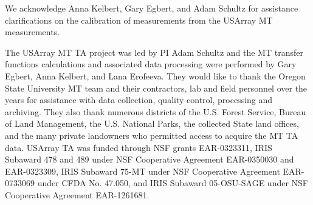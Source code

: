 \documentclass[12pt]{article}
\providecommand{\DIFdel}[1]{{\protect\color{red}\sout{#1}}}                      %
\providecommand{\DIFdelbegin}{} %
\providecommand{\DIFdelend}{} %
\providecommand{\DIFdelFL}[1]{\DIFdel{#1}} %
\providecommand{\DIFdelbeginFL}{} %
\providecommand{\DIFdelendFL}{} %
\begin{document}
We acknowledge Anna Kelbert, Gary Egbert, and Adam Schultz for assistance clarifications on the calibration of measurements from the USArray MT measurements.

The USArray MT TA project was led by PI Adam Schultz and the MT transfer functions calculations and associated data processing were performed by Gary Egbert, Anna Kelbert, and Lana Erofeeva.  They would like to thank the Oregon State University MT team and their contractors, lab and field personnel over the years for assistance with data collection, quality control, processing and archiving. They also thank numerous districts of the U.S. Forest Service, Bureau of Land Management, the U.S. National Parks, the collected State land offices, and the many private landowners who permitted access to acquire the MT TA data. USArray TA was funded through NSF grants EAR-0323311, IRIS Subaward 478 and 489 under NSF Cooperative Agreement EAR-0350030 and EAR-0323309, IRIS Subaward 75-MT under NSF Cooperative Agreement EAR-0733069 under CFDA No. 47.050, and IRIS Subaward 05-OSU-SAGE under NSF Cooperative Agreement EAR-1261681.

\clearpage

%

\DIFdelbegin %

\DIFdelend \clearpage

\begin{table}
\hfill
{}
\vspace{1em}
\hfill
{}
\vspace{1em}
  \caption{Summary error statistics based on time series shown in Figures~\ref{figure:UTP17}--\ref{figure:RET54}\DIFdelbeginFL \DIFdelFL{.  The first and last 18,725~s of the four-day segments were omitted from the calculations}\DIFdelendFL .}
\label{table:SummaryStatistics}
\end{table}
\end{document}
